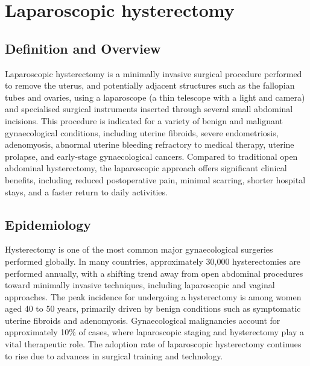 \chapter{Laparoscopic hysterectomy}

\section*{Definition and Overview}
Laparoscopic hysterectomy is a minimally invasive surgical procedure performed to remove the uterus, and potentially adjacent structures such as the fallopian tubes and ovaries, using a laparoscope (a thin telescope with a light and camera) and specialised surgical instruments inserted through several small abdominal incisions. This procedure is indicated for a variety of benign and malignant gynaecological conditions, including uterine fibroids, severe endometriosis, adenomyosis, abnormal uterine bleeding refractory to medical therapy, uterine prolapse, and early-stage gynaecological cancers. Compared to traditional open abdominal hysterectomy, the laparoscopic approach offers significant clinical benefits, including reduced postoperative pain, minimal scarring, shorter hospital stays, and a faster return to daily activities.

\section*{Epidemiology}
Hysterectomy is one of the most common major gynaecological surgeries performed globally. In many countries, approximately 30,000 hysterectomies are performed annually, with a shifting trend away from open abdominal procedures toward minimally invasive techniques, including laparoscopic and vaginal approaches. The peak incidence for undergoing a hysterectomy is among women aged 40 to 50 years, primarily driven by benign conditions such as symptomatic uterine fibroids and adenomyosis. Gynaecological malignancies account for approximately 10\% of cases, where laparoscopic staging and hysterectomy play a vital therapeutic role. The adoption rate of laparoscopic hysterectomy continues to rise due to advances in surgical training and technology.

